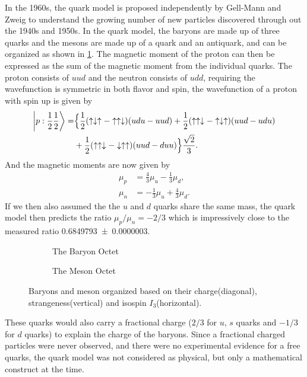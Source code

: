 \documentclass[../main.tex]{subfiles}
\begin{document}
In the 1960s, the quark model is proposed independently by Gell-Mann \cite{gell-mann1964} and Zweig  \cite{zweig1964a, zweig1964} to understand the growing number of new particles discovered through out
the 1940s and 1950s.
In the quark model, the baryons are made up of three quarks and the mesons are made up
of a quark and an antiquark, and can be organized as shown in \cref{fig:Octet}.
The magnetic moment of the proton can then be expressed as the sum of the magnetic moment
from the individual quarks. The proton consists of $uud$ and the neutron consists of $udd$,
requiring the wavefunction is symmetric in both flavor and spin, the wavefunction of a proton with 
spin up is given by
\begin{equation}
	\begin{split}
	\ket{p:\frac{1}{2} \frac{1}{2}}=&  \Bigl\{\frac{1}{2}(\uparrow\downarrow\uparrow-\uparrow\uparrow\downarrow)(udu-uud) + \frac{1}{2}(\uparrow\uparrow\downarrow-\uparrow\downarrow\uparrow)(uud-udu)\\
	&+\frac{1}{2}(\uparrow\uparrow\downarrow-\downarrow\uparrow\uparrow)(uud-duu)\Bigl\} \frac{\sqrt{2}}{3}.
	\end{split}
\end{equation}
And the magnetic moments are now given by
\begin{align}
	\mu_p & = \frac{4}{3}\mu_u-\frac{1}{3}\mu_d,  \\
	\mu_n & = -\frac{1}{3}\mu_u+\frac{4}{3}\mu_d.
\end{align}
If we then also assumed the the $u$ and $d$ quarks share the same mass, the quark model
then predicts the ratio $\mu_p/\mu_n=-2/3$ which is impressively close to the measured ratio
\num{0.6849793(3)}\cite{workman2022}.
\begin{figure}[h!]
	\centering
	\begin{subfigure}{0.45\linewidth}
		
		\caption{The Baryon Octet}
	\end{subfigure}
	\begin{subfigure}{0.45\linewidth}
		
		\caption{The Meson Octet}
	\end{subfigure}
	\caption{Baryons and meson organized based on their charge(diagonal), strangeness(vertical) and isospin $I_3$(horizontal). }
	\label{fig:Octet}
\end{figure}
These quarks would also carry a fractional charge ($2/3$ for $u$, $s$ quarks and $-1/3$ for $d$ quarks) to
explain the charge of the baryons. Since a fractional charged particles were never observed, and there were
no experimental evidence for a free quarks, the quark model was not considered as physical, but only a mathematical construct at the time.
\end{document}
